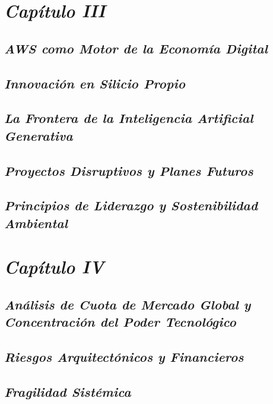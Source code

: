\documentclass[12pt,a4paper]{article}
\begin{document}
\newpage

\section{{\color{azulnoche}\textbf{\textit{Capítulo III}}}}
\subsection{{\color{azulnoche}\textbf{\textit{AWS como Motor de la Economía Digital}}}}
\subsection{{\color{azulnoche}\textbf{\textit{Innovación en Silicio Propio}}}}
\subsection{{\color{azulnoche}\textbf{\textit{La Frontera de la Inteligencia Artificial Generativa}}}}
\subsection{{\color{azulnoche}\textbf{\textit{Proyectos Disruptivos y Planes Futuros}}}}
\subsection{{\color{azulnoche}\textbf{\textit{Principios de Liderazgo y Sostenibilidad Ambiental}}}}

\newpage

\section{{\color{azulnoche}\textbf{\textit{Capítulo IV}}}}
\subsection{{\color{azulnoche}\textbf{\textit{Análisis de Cuota de Mercado Global y Concentración del Poder Tecnológico}}}}

\subsection{{\color{azulnoche}\textbf{\textit{Riesgos Arquitectónicos y Financieros}}}}

\subsection{{\color{azulnoche}\textbf{\textit{Fragilidad Sistémica}}}}
\end{document}
